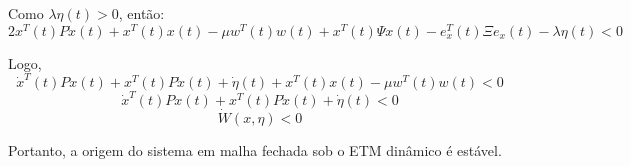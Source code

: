 Como $\lambda \eta(t) > 0$, então:
\begin{equation}
  2x^T(t)P\dot x(t) + x^T(t)x(t) - \mu w^T(t) w(t) + x^T(t) \Psi x(t) - e_x^T(t) \Xi e_x(t) - \lambda \eta(t) < 0
\end{equation}

Logo,
\begin{equation}
  \dot x^T(t)Px(t) + x^T(t)P\dot x(t) + \dot \eta(t) + x^T(t)x(t) - \mu w^T(t)w(t) < 0
\end{equation}
\begin{equation}
  \dot x^T(t)Px(t) + x^T(t)P\dot x(t) + \dot \eta(t) < 0
\end{equation}
\begin{equation}
  \dot W(x, \eta) < 0
\end{equation}

Portanto, a origem do sistema em malha fechada sob o ETM dinâmico é estável.